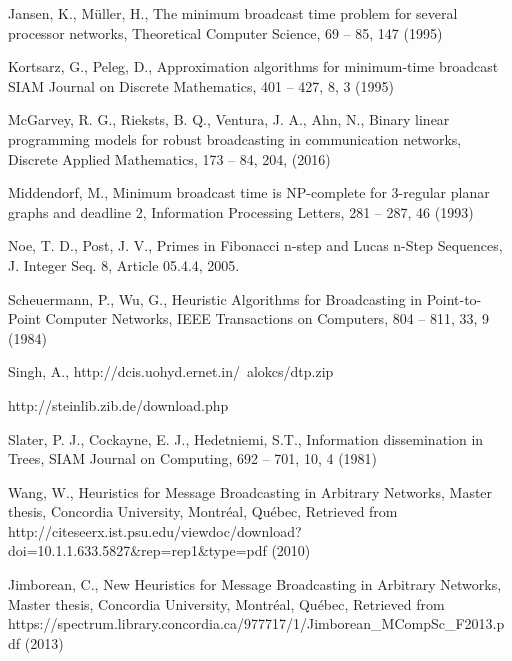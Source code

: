 \begin{thebibliography}{}
Jansen, K., M\"uller, H.,
The minimum broadcast time problem for several processor networks, 
Theoretical Computer Science, 69 -- 85, 147 (1995)

Kortsarz, G., Peleg, D.,
Approximation algorithms for minimum-time broadcast
SIAM Journal on Discrete Mathematics, 401 -- 427, 8, 3 (1995)

McGarvey, R. G., Rieksts, B. Q., Ventura, J. A., Ahn, N.,
Binary linear programming models for robust broadcasting in communication networks,
Discrete Applied Mathematics, 173 -- 84, 204, (2016)

Middendorf, M.,
Minimum broadcast time is NP-complete for 3-regular planar graphs and deadline 2,
Information Processing Letters, 281 -- 287, 46 (1993)

Noe, T. D., Post, J. V., 
Primes in Fibonacci n-step and Lucas n-Step Sequences,
J. Integer Seq. 8, Article 05.4.4, 2005.

Scheuermann, P., Wu, G.,
Heuristic Algorithms for Broadcasting in Point-to-Point Computer Networks,
IEEE Transactions on Computers, 804 -- 811, 33, 9 (1984)

Singh, A.,
http://dcis.uohyd.ernet.in/~alokcs/dtp.zip

http://steinlib.zib.de/download.php

Slater, P. J., Cockayne, E. J., Hedetniemi, S.T.,
Information dissemination in Trees,
SIAM Journal on Computing, 692 -- 701, 10, 4 (1981)

Wang, W.,
Heuristics for Message Broadcasting in Arbitrary Networks,
Master thesis, Concordia University, Montr\'eal, Qu\'ebec, 
Retrieved from http://citeseerx.ist.psu.edu/viewdoc/download?doi=10.1.1.633.5827\&rep=rep1\&type=pdf (2010)

Jimborean, C.,
New Heuristics for Message Broadcasting in Arbitrary Networks,
Master thesis, Concordia University, Montr\'eal, Qu\'ebec, 
Retrieved from https://spectrum.library.concordia.ca/977717/1/Jimborean\_MCompSc\_F2013.pdf (2013)


\end{thebibliography}



